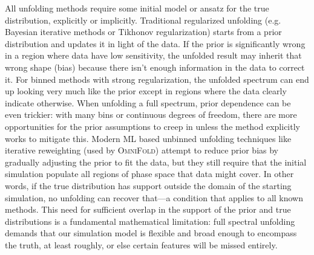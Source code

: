         All unfolding methods require some initial model or ansatz for the true distribution, explicitly or implicitly.
        Traditional regularized unfolding (e.g. Bayesian iterative methods or Tikhonov regularization) starts from a prior distribution and updates it in light of the data.
        If the prior is significantly wrong in a region where data have low sensitivity, the unfolded result may inherit that wrong shape (bias) because there isn’t enough information in the data to correct it.
        For binned methods with strong regularization, the unfolded spectrum can end up looking very much like the prior except in regions where the data clearly indicate otherwise.
        When unfolding a full spectrum, prior dependence can be even trickier: with many bins or continuous degrees of freedom, there are more opportunities for the prior assumptions to creep in unless the method explicitly works to mitigate this.
        Modern ML based unbinned unfolding techniques like iterative reweighting (used by \textsc{\textsc{OmniFold}}) attempt to reduce prior bias by gradually adjusting the prior to fit the data, but they still require that the initial simulation populate all regions of phase space that data might cover.
        In other words, if the true distribution has support outside the domain of the starting simulation, no unfolding can recover that---a condition that applies to all known methods.
        This need for sufficient overlap in the support of the prior and true distributions is a fundamental mathematical limitation: full spectral unfolding demands that our simulation model is flexible and broad enough to encompass the truth, at least roughly, or else certain features will be missed entirely.

